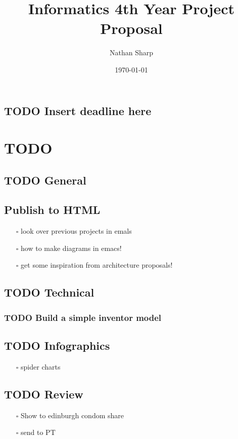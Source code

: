 \documentclass[11pt]{article}
\author{Nathan Sharp}
\date{\today}
\title{Informatics 4th Year Project Proposal}
\begin{document}
\maketitle
\tableofcontents


\subsection{{\bfseries\sffamily TODO} Insert deadline here}
\label{sec:orgb81b979}

\section{TODO}
\label{sec:orgc3eb84d}
\subsection{{\bfseries\sffamily TODO} General}
\label{sec:orga9b190d}
\subsection{Publish to HTML}
\label{sec:org4151840}
\begin{itemize}
\item[{$\square$}] look over previous projects in emals
\item[{$\square$}] how to make diagrams in emacs!
\item[{$\square$}] get some inspiration from architecture proposals!
\end{itemize}

\subsection{{\bfseries\sffamily TODO} Technical}
\label{sec:org2a503d4}
\subsubsection{{\bfseries\sffamily TODO} Build a simple inventor model}
\label{sec:orga64caad}
\subsection{{\bfseries\sffamily TODO} Infographics}
\label{sec:org3829ae9}
\begin{itemize}
\item[{$\square$}] spider charts
\end{itemize}


\subsection{{\bfseries\sffamily TODO} Review}
\label{sec:org07a6421}
\begin{itemize}
\item[{$\square$}] Show to edinburgh condom share
\item[{$\square$}] send to PT
\end{itemize}
\end{document}

